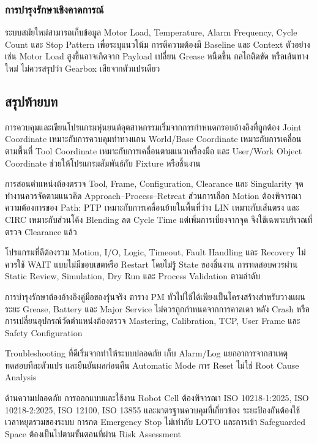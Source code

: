 \subsubsection{การบำรุงรักษาเชิงคาดการณ์}

ระบบสมัยใหม่สามารถเก็บข้อมูล Motor Load, Temperature, Alarm Frequency, Cycle Count และ Stop Pattern เพื่อระบุแนวโน้ม การตีความต้องมี Baseline และ Context ตัวอย่างเช่น Motor Load สูงขึ้นอาจเกิดจาก Payload เปลี่ยน Grease หนืดขึ้น กลไกติดขัด หรือเส้นทางใหม่ ไม่ควรสรุปว่า Gearbox เสียจากตัวแปรเดียว



\subsection{สรุปท้ายบท}

การควบคุมและเขียนโปรแกรมหุ่นยนต์อุตสาหกรรมเริ่มจากการกำหนดกรอบอ้างอิงที่ถูกต้อง Joint Coordinate เหมาะกับการควบคุมท่าทางแกน World/Base Coordinate เหมาะกับการเคลื่อนตามพื้นที่ Tool Coordinate เหมาะกับการเคลื่อนตามแนวเครื่องมือ และ User/Work Object Coordinate ช่วยให้โปรแกรมสัมพันธ์กับ Fixture หรือชิ้นงาน

การสอนตำแหน่งต้องตรวจ Tool, Frame, Configuration, Clearance และ Singularity จุดทำงานควรจัดตามแนวคิด Approach–Process–Retreat ส่วนการเลือก Motion ต้องพิจารณาความต้องการของ Path: PTP เหมาะกับการเคลื่อนย้ายในพื้นที่ว่าง LIN เหมาะกับเส้นตรง และ CIRC เหมาะกับส่วนโค้ง Blending ลด Cycle Time แต่เพิ่มการเบี่ยงจากจุด จึงใช้เฉพาะบริเวณที่ตรวจ Clearance แล้ว

โปรแกรมที่ดีต้องรวม Motion, I/O, Logic, Timeout, Fault Handling และ Recovery ไม่ควรใช้ WAIT แบบไม่มีขอบเขตหรือ Restart โดยไม่รู้ State ของชิ้นงาน การทดสอบควรผ่าน Static Review, Simulation, Dry Run และ Process Validation ตามลำดับ

การบำรุงรักษาต้องอ้างอิงคู่มือของรุ่นจริง ตาราง PM ทั่วไปใช้ได้เพียงเป็นโครงสร้างสำหรับวางแผน ระยะ Grease, Battery และ Major Service ไม่ควรถูกกำหนดจากการคาดเดา หลัง Crash หรือการเปลี่ยนอุปกรณ์วัดตำแหน่งต้องตรวจ Mastering, Calibration, TCP, User Frame และ Safety Configuration

Troubleshooting ที่ดีเริ่มจากทำให้ระบบปลอดภัย เก็บ Alarm/Log แยกอาการจากสาเหตุ ทดสอบทีละตัวแปร และยืนยันผลก่อนคืน Automatic Mode การ Reset ไม่ใช่ Root Cause Analysis

ด้านความปลอดภัย การออกแบบและใช้งาน Robot Cell ต้องพิจารณา ISO 10218-1:2025, ISO 10218-2:2025, ISO 12100, ISO 13855 และมาตรฐานควบคุมที่เกี่ยวข้อง ระยะป้องกันต้องใช้เวลาหยุดรวมของระบบ การกด Emergency Stop ไม่เท่ากับ LOTO และการเข้า Safeguarded Space ต้องเป็นไปตามขั้นตอนที่ผ่าน Risk Assessment



